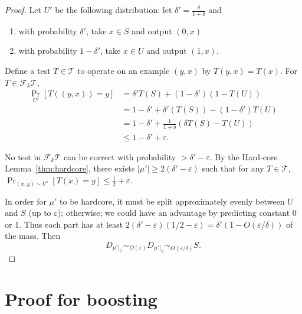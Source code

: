\begin{proof}
Let $U'$ be the following distribution: let $\delta'=\frac{\delta}{1+\delta}$ and 
\begin{enumerate}
\item
with probability $\delta'$, take $x\in S$ and output $(0,x)$
\item
with probability $1-\delta'$, take $x\in U$ and output $(1,x)$.
\end{enumerate}
Define a test $T\in \mathcal T$ to operate on an example $(y, x)$ by $T(y,x)=T(x)$. For $T\in \mathcal F_k \mathcal T$, 
\begin{align}
\Pr_{U'}[T((y,x))=y] &= \delta' T(S) + (1-\delta') (1-T(U)) \\
   &= 1-\delta' + \delta' (T(S)) - (1-\delta') T(U)\\
   &= 1-\delta' + \frac{1}{1+\delta} (\delta T(S) - T(U))\\
   &\le 1-\delta'+\varepsilon.
\end{align}

No test in $\mathcal F_k \mathcal T$ can be correct with probability $>\delta'-\varepsilon$. By the Hard-core Lemma~\ref{thm:hardcore}, there exists $|\mu'|\ge 2(\delta'-\varepsilon)$ such that for any $T\in \mathcal T$, $\Pr_{(x,y) \sim U'}[T(x)=y]\le  \frac{1}{2}+\varepsilon$.

In order for $\mu'$ to be hardcore, it must be split approximately evenly between $U$ and $S$ (up to $\varepsilon$); otherwise; we could have an advantage by predicting constant 0 or 1. 
Thus each part has at least $2(\delta'-\varepsilon) (1/2 - \varepsilon) = \delta'(1-O(\varepsilon/\delta))$ of the mass. Then
$$D_{\mu'|_U}\sim_{O(\varepsilon)} D_{\mu'|_S}\sim_{O(\varepsilon/\delta)} S.$$
\end{proof}

\section{Proof for boosting}

